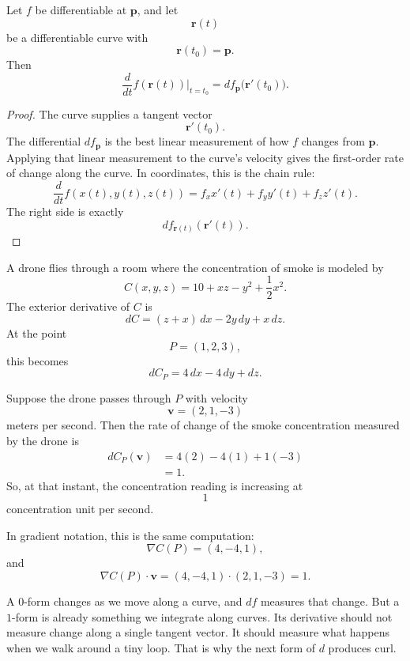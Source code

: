 \begin{theorem}
Let \(f\) be differentiable at \(\mathbf p\), and let
\[
    \mathbf r(t)
\]
be a differentiable curve with
\[
    \mathbf r(t_0)=\mathbf p.
\]
Then
\[
\boxed{
    \frac{d}{dt}f(\mathbf r(t))\bigg|_{t=t_0}
    =
    df_{\mathbf p}\bigl(\mathbf r'(t_0)\bigr).
}
\]
\end{theorem}

\begin{proof}
The curve supplies a tangent vector
\[
    \mathbf r'(t_0).
\]
The differential \(df_{\mathbf p}\) is the best linear measurement of how \(f\) changes
from \(\mathbf p\).  Applying that linear measurement to the curve's velocity gives the
first-order rate of change along the curve.  In coordinates, this is the chain rule:
\[
    \frac{d}{dt}f(x(t),y(t),z(t))
    =
    f_xx'(t)+f_yy'(t)+f_zz'(t).
\]
The right side is exactly
\[
    df_{\mathbf r(t)}(\mathbf r'(t)).
\]
\end{proof}

\begin{example}
A drone flies through a room where the concentration of smoke is modeled by
\[
    C(x,y,z)=10+xz-y^2+\frac12x^2.
\]
The exterior derivative of \(C\) is
\[
    dC=(z+x)\,dx-2y\,dy+x\,dz.
\]
At the point
\[
    P=(1,2,3),
\]
this becomes
\[
    dC_P=4\,dx-4\,dy+dz.
\]

Suppose the drone passes through \(P\) with velocity
\[
    \mathbf v=(2,1,-3)
\]
meters per second.  Then the rate of change of the smoke concentration measured by
the drone is
\[
\begin{aligned}
    dC_P(\mathbf v)
    &=
    4(2)-4(1)+1(-3)\\
    &=
    1.
\end{aligned}
\]
So, at that instant, the concentration reading is increasing at
\[
    1
\]
concentration unit per second.

In gradient notation, this is the same computation:
\[
    \nabla C(P)=(4,-4,1),
\]
and
\[
    \nabla C(P)\cdot\mathbf v
    =
    (4,-4,1)\cdot(2,1,-3)=1.
\]
\end{example}

A \(0\)-form changes as we move along a curve, and \(df\) measures that change.  But a
\(1\)-form is already something we integrate along curves.  Its derivative should not
measure change along a single tangent vector.  It should measure what happens when we
walk around a tiny loop.  That is why the next form of \(d\) produces curl.

